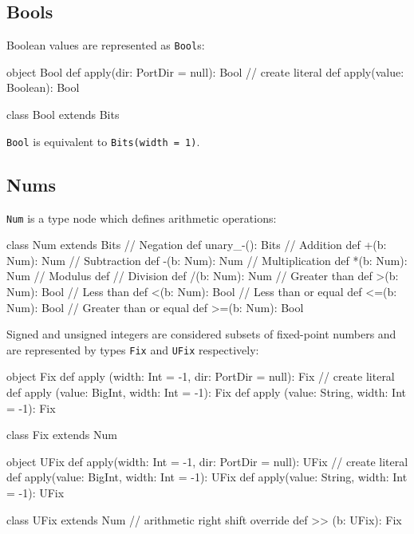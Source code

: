 \documentclass[10pt,twocolumn]{article}
\def\code#1{{\small\tt #1}}
\begin{document}
\subsection{Bools}

Boolean values are represented as \code{Bool}s:

\begin{scala}
object Bool {
  def apply(dir: PortDir = null): Bool
  // create literal
  def apply(value: Boolean): Bool
}

class Bool extends Bits
\end{scala}

\noindent
\code{Bool} is equivalent to \code{Bits(width = 1)}.

\subsection{Nums}

\code{Num} is a type node which defines arithmetic operations:

\begin{scala}
class Num extends Bits {
  // Negation
  def unary_-(): Bits
  // Addition
  def +(b: Num): Num
  // Subtraction
  def -(b: Num): Num
  // Multiplication
  def *(b: Num): Num
  // Modulus
  def %
  // Division
  def /(b: Num): Num
  // Greater than
  def >(b: Num): Bool
  // Less than
  def <(b: Num): Bool
  // Less than or equal
  def <=(b: Num): Bool
  // Greater than or equal
  def >=(b: Num): Bool
}
\end{scala}

Signed and unsigned integers
are considered subsets of fixed-point numbers and are represented by
types \code{Fix} and \code{UFix} respectively:

\begin{scala}
object Fix {
  def apply (width: Int = -1, 
             dir: PortDir = null): Fix
  // create literal
  def apply (value: BigInt, width: Int = -1): Fix
  def apply (value: String, width: Int = -1): Fix
}

class Fix extends Num 

object UFix {
  def apply(width: Int = -1, 
            dir: PortDir = null): UFix
  // create literal
  def apply(value: BigInt, width: Int = -1): UFix
  def apply(value: String, width: Int = -1): UFix
}

class UFix extends Num {
  // arithmetic right shift
  override def >> (b: UFix): Fix
}
\end{scala}
\end{document}
